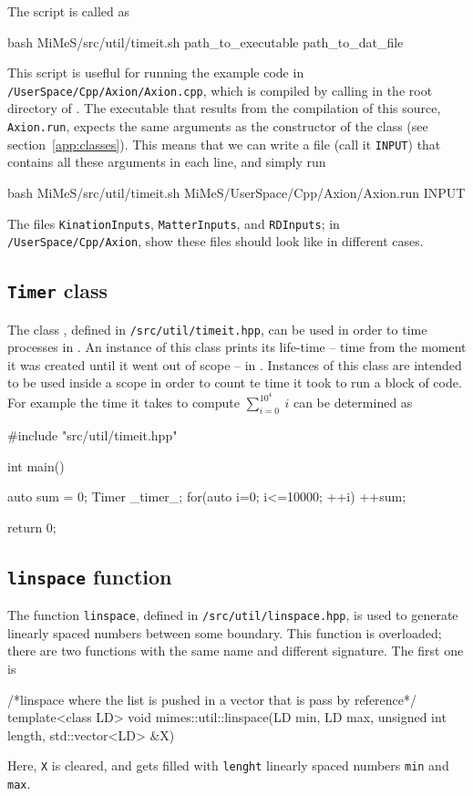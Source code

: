 \documentclass[11pt,a4paper]{article}
\begin{document}
The script is called as 
%
\begin{cpp}
	bash MiMeS/src/util/timeit.sh path_to_executable path_to_dat_file
\end{cpp}
%
This script is useflul for running the example code in {\tt \mimes/UserSpace/Cpp/Axion/Axion.cpp}, which is compiled by calling  in the root directory of \mimes. The executable that results from the compilation of this source, {\tt Axion.run}, expects the same arguments as the constructor of the  class (see section~\ref{app:classes}). This means that we can write a file (call it {\tt INPUT}) that contains all these arguments in each line, and simply run  
%
\begin{cpp}
	bash MiMeS/src/util/timeit.sh MiMeS/UserSpace/Cpp/Axion/Axion.run INPUT
\end{cpp}
%
The files {\tt KinationInputs}, {\tt MatterInputs}, and {\tt RDInputs}; in {\tt \mimes/UserSpace/Cpp/Axion}, show these files should look like in different cases.


\subsection{{\tt Timer} \CPP class}
%
The class , defined in {\tt \mimes/src/util/timeit.hpp}, can be used in order to time processes in \CPP. An instance of this class prints  its life-time -- \ie time from the moment it was created until it went out of scope -- in . Instances of this class are intended to be used inside a scope in order to count te time it took to run a block of code. For example the time it takes to compute  $\sum_{i=0}^{10^4} \ i$ can be determined as  
%
\begin{cpp}
	#include "src/util/timeit.hpp"
	
	int main(){
		auto sum = 0;
		{	
			Timer _timer_;
			for(auto i=0; i<=10000; ++i){ ++sum;}	
		}
	
		return 0;
	}
\end{cpp}

\subsection{{\tt linspace} function}
%
The function {\tt linspace}, defined in {\tt \mimes/src/util/linspace.hpp}, is used to generate linearly spaced numbers between some boundary. This function is overloaded; there are two functions with the same name and different signature. The first one is 
%
\begin{cpp}
    /*linspace where the list is pushed in a vector that is pass by reference*/	
	template<class LD>
	void mimes::util::linspace(LD min, LD max, unsigned int length, std::vector<LD> &X)
\end{cpp}
%
Here, {\tt X} is cleared, and gets filled with  {\tt lenght} linearly spaced numbers {\tt min} and {\tt max}.
\end{document}
